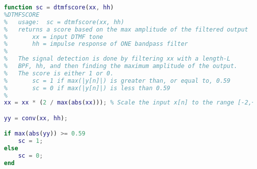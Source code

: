 \begin{lstlisting}[language=Matlab]
function sc = dtmfscore(xx, hh)
%DTMFSCORE
%   usage:  sc = dtmfscore(xx, hh)
%   returns a score based on the max amplitude of the filtered output
%       xx = input DTMF tone
%       hh = impulse response of ONE bandpass filter
%
%   The signal detection is done by filtering xx with a length-L
%   BPF, hh, and then finding the maximum amplitude of the output.
%   The score is either 1 or 0.
%       sc = 1 if max(|y[n]|) is greater than, or equal to, 0.59
%       sc = 0 if max(|y[n]|) is less than 0.59
%
xx = xx * (2 / max(abs(xx))); % Scale the input x[n] to the range [-2,+2]

yy = conv(xx, hh);

if max(abs(yy)) >= 0.59
    sc = 1;
else
    sc = 0;
end
\end{lstlisting}